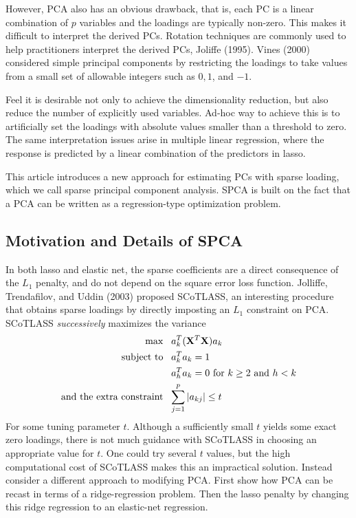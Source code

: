 However, PCA also has an obvious drawback, that is, each PC is a linear combination of $p$ variables and the loadings are typically non-zero. This makes it difficult to interpret the derived PCs. Rotation techniques are commonly used to help practitioners interpret the derived PCs, Joliffe (1995). Vines (2000) considered simple principal components by restricting the loadings to take values from a small set of allowable integers such as $0, 1$, and $-1$.

Feel it is desirable not only to achieve the dimensionality reduction, but also reduce the number of explicitly used variables. Ad-hoc way to achieve this is to artificially set the loadings with absolute values smaller than a threshold to zero. The same interpretation issues arise in multiple linear regression, where the response is predicted by a linear combination of the predictors in lasso. 

This article introduces a new approach for estimating PCs with sparse loading, which we call sparse principal component analysis. SPCA is built on the fact that a PCA can be written as a regression-type optimization problem. 

\subsection{Motivation and Details of SPCA}

In both lasso and elastic net, the sparse coefficients are a direct consequence of the $L_1$ penalty, and do not depend on the square error loss function. Jolliffe, Trendafilov, and Uddin (2003) proposed SCoTLASS, an interesting procedure that obtains sparse loadings by directly imposting an $L_1$ constraint on PCA. SCoTLASS \emph{successively} maximizes the variance 
\begin{align}
\label{eq:spca-3.1}
\max              &\;\;\; a_k^T(\mathbf{X}^T \mathbf{X})a_k \\
\text{subject to} &\;\;\;
\label{eq:spca-3.2}
\begin{alignedat}[t]{2}
    a_k^T a_k &= 1 \\ 
    a_h^T a_k &= 0\text{ for \(k \geq 2\) and \(h < k\)} \\
\end{alignedat}\\
\text{and the extra constraint}&\;\;\;
\label{eq:spca-3.3}
\begin{alignedat}[t]{2}
    \sum_{j=1}^p |a_{kj}| \leq t\\
\end{alignedat}
\end{align}
For some tuning parameter $t$. Although a sufficiently small $t$ yields some exact zero loadings, there is not much guidance with SCoTLASS in choosing an appropriate value for $t$. One could try several $t$ values, but the high computational cost of SCoTLASS makes this an impractical solution. Instead consider a different approach to modifying PCA. First show how PCA can be recast in terms of a ridge-regression problem. Then the lasso penalty by changing this ridge regression to an elastic-net regression. 

